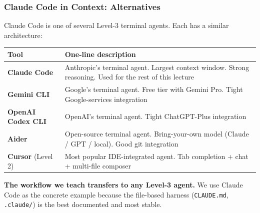 \documentclass[10pt,english,aspectratio=169]{beamer}
\begin{document}
\begin{frame}
\frametitle{Claude Code in Context: Alternatives}

Claude Code is one of several Level-3 terminal agents. Each has a similar architecture:

\vspace{0.3cm}

\begin{center}
\small
\begin{tabular}{|l|p{9.5cm}|}
\hline
\textbf{Tool} & \textbf{One-line description} \\ \hline
\textbf{Claude Code} & Anthropic's terminal agent. Largest context window. Strong reasoning. Used for the rest of this lecture \\ \hline
\textbf{Gemini CLI} & Google's terminal agent. Free tier with Gemini Pro. Tight Google-services integration \\ \hline
\textbf{OpenAI Codex CLI} & OpenAI's terminal agent. Tight ChatGPT-Plus integration \\ \hline
\textbf{Aider} & Open-source terminal agent. Bring-your-own model (Claude / GPT / local). Good git integration \\ \hline
\textbf{Cursor} (Level 2) & Most popular IDE-integrated agent. Tab completion + chat + multi-file composer \\ \hline
\end{tabular}
\end{center}

\vspace{0.3cm}

\textbf{The workflow we teach transfers to any Level-3 agent.} We use Claude Code as the concrete example because the file-based harness (\texttt{CLAUDE.md}, \texttt{.claude/}) is the best documented and most stable.
\end{frame}
\end{document}
